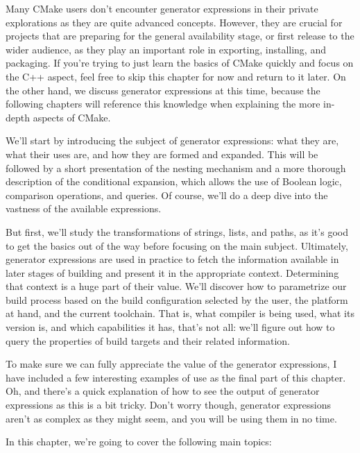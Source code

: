 Many CMake users don’t encounter generator expressions in their private explorations as they are quite advanced concepts. However, they are crucial for projects that are preparing for the general availability stage, or first release to the wider audience, as they play an important role in exporting, installing, and packaging. If you’re trying to just learn the basics of CMake quickly and focus on the C++ aspect, feel free to skip this chapter for now and return to it later. On the other hand, we discuss generator expressions at this time, because the following chapters will reference this knowledge when explaining the more in-depth aspects of CMake.

We’ll start by introducing the subject of generator expressions: what they are, what their uses are, and how they are formed and expanded. This will be followed by a short presentation of the nesting mechanism and a more thorough description of the conditional expansion, which allows the use of Boolean logic, comparison operations, and queries. Of course, we’ll do a deep dive into the vastness of the available expressions.

But first, we’ll study the transformations of strings, lists, and paths, as it’s good to get the basics out of the way before focusing on the main subject. Ultimately, generator expressions are used in practice to fetch the information available in later stages of building and present it in the appropriate context. Determining that context is a huge part of their value. We’ll discover how to parametrize our build process based on the build configuration selected by the user, the platform at hand, and the current toolchain. That is, what compiler is being used, what its version is, and which capabilities it has, that’s not all: we’ll figure out how to query the properties of build targets and their related information.

To make sure we can fully appreciate the value of the generator expressions, I have included a few interesting examples of use as the final part of this chapter. Oh, and there’s a quick explanation of how to see the output of generator expressions as this is a bit tricky. Don’t worry though, generator expressions aren’t as complex as they might seem, and you will be using them in no time.

In this chapter, we’re going to cover the following main topics:

